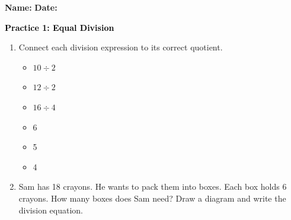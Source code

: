 \documentclass[12pt, letterpaper, fleqn]{article}
\begin{document}
\textbf{Name:} \underline{\hspace{5cm}}
\hfill
\textbf{Date:} \underline{\hspace{3cm}}\\

\begin{tcolorbox}[colback=customteal!20]
    \large\textcolor{black}{\textbf{Practice 1: Equal Division}}
\end{tcolorbox}

\vspace{5mm}
\begin{enumerate}[itemsep=2.5cm, leftmargin=0.6cm]
\item Connect each division expression to its correct quotient.
\\
\begin{minipage}{0.4\textwidth}
\begin{itemize}[itemsep=1cm]
  \item $10 \div 2$
  \item $12 \div 2$
  \item $16 \div 4$
\end{itemize}
\end{minipage}
\begin{minipage}{0.4\textwidth}
\begin{itemize}[itemsep=1cm]
  \item 6
  \item 5
  \item 4
\end{itemize}
\end{minipage}

\item Sam has 18 crayons. He wants to pack them into boxes. Each box holds 6 crayons. How many boxes does Sam need? Draw a diagram and write the division equation.
\end{enumerate}
\end{document}
